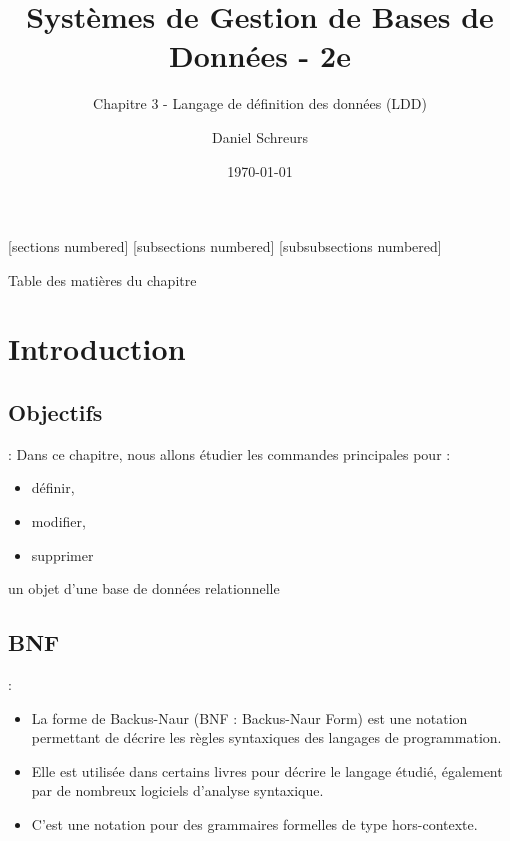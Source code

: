 \documentclass[10pt]{beamer}
\title{Systèmes de Gestion de Bases de Données - 2e}
\subtitle{Chapitre 3 - Langage de définition des données (LDD)}
\date{\today}
\author{Daniel Schreurs}
\institute{Haute École de Province de Liège}
\begin{document}
\maketitle

[sections numbered]
[subsections numbered]
[subsubsections numbered]
\begin{frame}[allowframebreaks]{Table des matières du chapitre}
    \tableofcontents[subsectionstyle=show/show/hide,subsubsectionstyle=show/show/hide,]
\end{frame}

\section{Introduction}
\tocss
\subsection{Objectifs}
\begin{frame}{\secname : \subsecname}
    Dans ce chapitre, nous allons étudier les commandes principales pour :

    \begin{itemize}
        \item définir,
        \item modifier,
        \item supprimer
    \end{itemize}
    un objet d’une base de données relationnelle
\end{frame}

\subsection{BNF}
\begin{frame}{\secname : \subsecname}
    \begin{itemize}
        \item La forme de Backus-Naur (BNF : Backus-Naur Form) est une notation permettant de décrire les règles syntaxiques des langages de programmation.
        \item Elle est utilisée dans certains livres pour décrire le langage étudié, également par de nombreux logiciels d'analyse syntaxique.
        \item C'est une notation pour des grammaires formelles de type hors-contexte.
    \end{itemize}
\end{frame}
\end{document}
